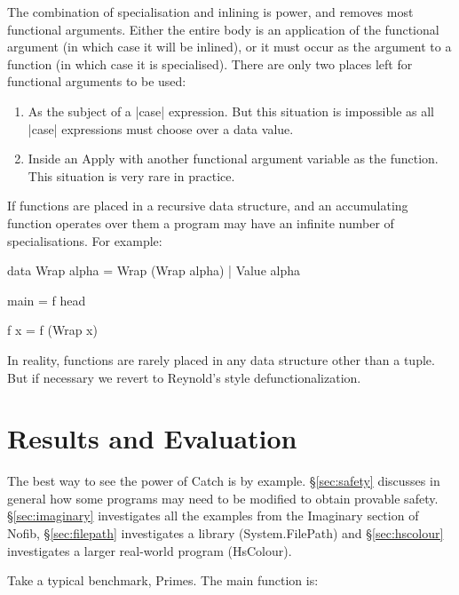 \documentclass[preprint]{sigplanconf}
\newcommand{\C}[1]{\textsf{#1}}
\begin{document}
The combination of specialisation and inlining is power, and removes most functional arguments. Either the entire body is an application of the functional argument (in which case it will be inlined), or it must occur as the argument to a function (in which case it is specialised). There are only two places left for functional arguments to be used:

\begin{enumerate}
\item As the subject of a |case| expression. But this situation is impossible as all |case| expressions must choose over a data value.

\item Inside an \C{Apply} with another functional argument variable as the function. This situation is very rare in practice.
\end{enumerate}

If functions are placed in a recursive data structure, and an accumulating function operates over them a program may have an infinite number of specialisations. For example:

\begin{code}
data Wrap alpha = Wrap (Wrap alpha) | Value alpha

main = f head

f x = f (Wrap x)
\end{code}

In reality, functions are rarely placed in any data structure other than a tuple. But if necessary we revert to Reynold's style defunctionalization.

\section{Results and Evaluation}
\label{sec:results}

The best way to see the power of Catch is by example. \S\ref{sec:safety} discusses in general how some programs may need to be modified to obtain provable safety. \S\ref{sec:imaginary} investigates all the examples from the Imaginary section of Nofib, \S\ref{sec:filepath} investigates a library (System.FilePath) and \S\ref{sec:hscolour} investigates a larger real-world program (HsColour).

Take a typical benchmark, Primes. The \C{main} function is:

\end{document}
